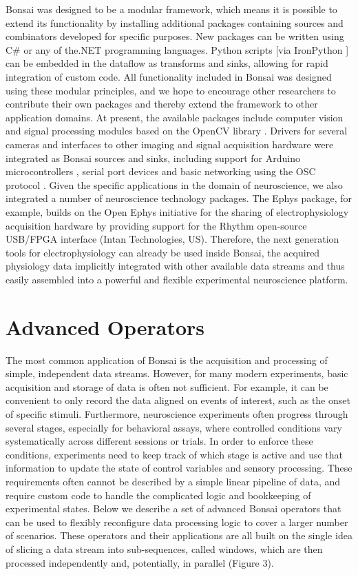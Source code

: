 Bonsai was designed to be a modular framework, which means it is possible to extend its functionality by installing additional packages containing sources and combinators developed for specific purposes. New packages can be written using C\# or any of the.NET programming languages. Python scripts [via IronPython \cite{IronPython2014}] can be embedded in the dataflow as transforms and sinks, allowing for rapid integration of custom code. All functionality included in Bonsai was designed using these modular principles, and we hope to encourage other researchers to contribute their own packages and thereby extend the framework to other application domains. At present, the available packages include computer vision and signal processing modules based on the OpenCV library \cite{Itseez2014}. Drivers for several cameras and interfaces to other imaging and signal acquisition hardware were integrated as Bonsai sources and sinks, including support for Arduino microcontrollers \cite{Banzi2014}, serial port devices and basic networking using the OSC protocol \cite{Wright2003}. Given the specific applications in the domain of neuroscience, we also integrated a number of neuroscience technology packages. The Ephys package, for example, builds on the Open Ephys initiative for the sharing of electrophysiology acquisition hardware \cite{Voigts2013} by providing support for the Rhythm open-source USB/FPGA interface (Intan Technologies, US). Therefore, the next generation tools for electrophysiology can already be used inside Bonsai, the acquired physiology data implicitly integrated with other available data streams and thus easily assembled into a powerful and flexible experimental neuroscience platform.

\section{Advanced Operators}

The most common application of Bonsai is the acquisition and processing of simple, independent data streams. However, for many modern experiments, basic acquisition and storage of data is often not sufficient. For example, it can be convenient to only record the data aligned on events of interest, such as the onset of specific stimuli. Furthermore, neuroscience experiments often progress through several stages, especially for behavioral assays, where controlled conditions vary systematically across different sessions or trials. In order to enforce these conditions, experiments need to keep track of which stage is active and use that information to update the state of control variables and sensory processing. These requirements often cannot be described by a simple linear pipeline of data, and require custom code to handle the complicated logic and bookkeeping of experimental states. Below we describe a set of advanced Bonsai operators that can be used to flexibly reconfigure data processing logic to cover a larger number of scenarios. These operators and their applications are all built on the single idea of slicing a data stream into sub-sequences, called windows, which are then processed independently and, potentially, in parallel (Figure 3).

